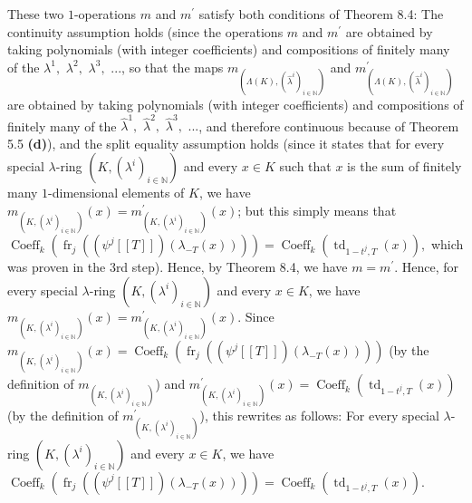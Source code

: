 \documentclass[numbers=enddot,12pt,final,onecolumn,notitlepage]{scrartcl}%
\begin{document}
These two $1$-operations $m$ and $m^{\prime}$ satisfy both conditions of
Theorem 8.4: The continuity assumption holds (since the operations $m$ and
$m^{\prime}$ are obtained by taking polynomials (with integer coefficients)
and compositions of finitely many of the $\lambda^{1},$ $\lambda^{2},$
$\lambda^{3},$ $...$, so that the maps $m_{\left(  \Lambda\left(  K\right)
,\left(  \widehat{\lambda}^{i}\right)  _{i\in\mathbb{N}}\right)  }$ and
$m_{\left(  \Lambda\left(  K\right)  ,\left(  \widehat{\lambda}^{i}\right)
_{i\in\mathbb{N}}\right)  }^{\prime}$ are obtained by taking polynomials (with
integer coefficients) and compositions of finitely many of the
$\widehat{\lambda}^{1},$ $\widehat{\lambda}^{2},$ $\widehat{\lambda}^{3},$
$...$, and therefore continuous because of Theorem 5.5 \textbf{(d)}), and the
split equality assumption holds (since it states that for every special
$\lambda$-ring $\left(  K,\left(  \lambda^{i}\right)  _{i\in\mathbb{N}%
}\right)  $ and every $x\in K$ such that $x$ is the sum of finitely many
$1$-dimensional elements of $K$, we have $m_{\left(  K,\left(  \lambda
^{i}\right)  _{i\in\mathbb{N}}\right)  }\left(  x\right)  =m_{\left(
K,\left(  \lambda^{i}\right)  _{i\in\mathbb{N}}\right)  }^{\prime}\left(
x\right)  $; but this simply means that $\operatorname*{Coeff}\nolimits_{k}%
\left(  \operatorname*{fr}\nolimits_{j}\left(  \left(  \psi^{j}\left[  \left[
T\right]  \right]  \right)  \left(  \lambda_{-T}\left(  x\right)  \right)
\right)  \right)  =\operatorname*{Coeff}\nolimits_{k}\left(
\operatorname*{td}\nolimits_{1-t^{j},T}\left(  x\right)  \right)  ,$ which was
proven in the 3rd step). Hence, by Theorem 8.4, we have $m=m^{\prime}$. Hence,
for every special $\lambda$-ring $\left(  K,\left(  \lambda^{i}\right)
_{i\in\mathbb{N}}\right)  $ and every $x\in K$, we have $m_{\left(  K,\left(
\lambda^{i}\right)  _{i\in\mathbb{N}}\right)  }\left(  x\right)  =m_{\left(
K,\left(  \lambda^{i}\right)  _{i\in\mathbb{N}}\right)  }^{\prime}\left(
x\right)  $. Since $m_{\left(  K,\left(  \lambda^{i}\right)  _{i\in\mathbb{N}%
}\right)  }\left(  x\right)  =\operatorname*{Coeff}\nolimits_{k}\left(
\operatorname*{fr}\nolimits_{j}\left(  \left(  \psi^{j}\left[  \left[
T\right]  \right]  \right)  \left(  \lambda_{-T}\left(  x\right)  \right)
\right)  \right)  $ (by the definition of $m_{\left(  K,\left(  \lambda
^{i}\right)  _{i\in\mathbb{N}}\right)  }$) and $m_{\left(  K,\left(
\lambda^{i}\right)  _{i\in\mathbb{N}}\right)  }^{\prime}\left(  x\right)
=\operatorname*{Coeff}\nolimits_{k}\left(  \operatorname*{td}%
\nolimits_{1-t^{j},T}\left(  x\right)  \right)  $ (by the definition of
$m_{\left(  K,\left(  \lambda^{i}\right)  _{i\in\mathbb{N}}\right)  }^{\prime
}$), this rewrites as follows: For every special $\lambda$-ring $\left(
K,\left(  \lambda^{i}\right)  _{i\in\mathbb{N}}\right)  $ and every $x\in K$,
we have $\operatorname*{Coeff}\nolimits_{k}\left(  \operatorname*{fr}%
\nolimits_{j}\left(  \left(  \psi^{j}\left[  \left[  T\right]  \right]
\right)  \left(  \lambda_{-T}\left(  x\right)  \right)  \right)  \right)
=\operatorname*{Coeff}\nolimits_{k}\left(  \operatorname*{td}%
\nolimits_{1-t^{j},T}\left(  x\right)  \right)  $.
\end{document}
